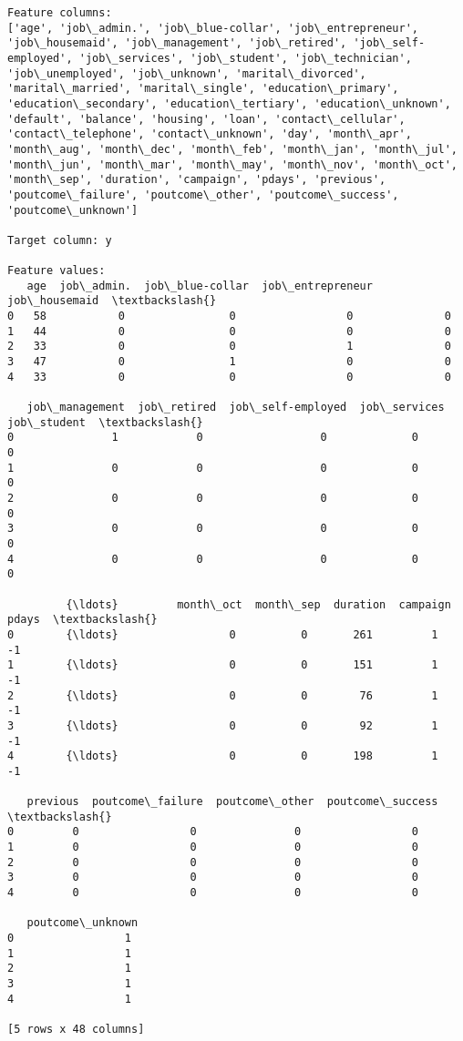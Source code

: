 \documentclass[11pt]{article}
\begin{document}
    \begin{Verbatim}[commandchars=\\\{\}]
Feature columns:
['age', 'job\_admin.', 'job\_blue-collar', 'job\_entrepreneur', 'job\_housemaid', 'job\_management', 'job\_retired', 'job\_self-employed', 'job\_services', 'job\_student', 'job\_technician', 'job\_unemployed', 'job\_unknown', 'marital\_divorced', 'marital\_married', 'marital\_single', 'education\_primary', 'education\_secondary', 'education\_tertiary', 'education\_unknown', 'default', 'balance', 'housing', 'loan', 'contact\_cellular', 'contact\_telephone', 'contact\_unknown', 'day', 'month\_apr', 'month\_aug', 'month\_dec', 'month\_feb', 'month\_jan', 'month\_jul', 'month\_jun', 'month\_mar', 'month\_may', 'month\_nov', 'month\_oct', 'month\_sep', 'duration', 'campaign', 'pdays', 'previous', 'poutcome\_failure', 'poutcome\_other', 'poutcome\_success', 'poutcome\_unknown']

Target column: y

Feature values:
   age  job\_admin.  job\_blue-collar  job\_entrepreneur  job\_housemaid  \textbackslash{}
0   58           0                0                 0              0   
1   44           0                0                 0              0   
2   33           0                0                 1              0   
3   47           0                1                 0              0   
4   33           0                0                 0              0   

   job\_management  job\_retired  job\_self-employed  job\_services  job\_student  \textbackslash{}
0               1            0                  0             0            0   
1               0            0                  0             0            0   
2               0            0                  0             0            0   
3               0            0                  0             0            0   
4               0            0                  0             0            0   

         {\ldots}         month\_oct  month\_sep  duration  campaign  pdays  \textbackslash{}
0        {\ldots}                 0          0       261         1     -1   
1        {\ldots}                 0          0       151         1     -1   
2        {\ldots}                 0          0        76         1     -1   
3        {\ldots}                 0          0        92         1     -1   
4        {\ldots}                 0          0       198         1     -1   

   previous  poutcome\_failure  poutcome\_other  poutcome\_success  \textbackslash{}
0         0                 0               0                 0   
1         0                 0               0                 0   
2         0                 0               0                 0   
3         0                 0               0                 0   
4         0                 0               0                 0   

   poutcome\_unknown  
0                 1  
1                 1  
2                 1  
3                 1  
4                 1  

[5 rows x 48 columns]

    \end{Verbatim}
\end{document}
